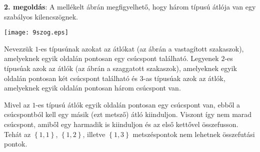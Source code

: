 \documentclass[a4paper,10pt]{article}
\begin{document}
{\bf 2. megoldás}: A mellékelt ábrán megfigyelhető, hogy három
típusú átlója van egy szabályos
kilencszögnek.

\begin{center}
\texttt{[image: 9szog.eps]}%
\end{center}
Nevezzük $1$-es típusúnak azokat az átlókat (az
ábrán a vastagított szakaszok), amelyeknek egyik
oldalán pontosan egy csúcs\-pont található. Legyenek
$2$-es típusúak azok az átlók (az ábrán a
szaggatott szakaszok), amelyeknek egyik oldalán pontosan két
csúcspont található és $3$-as típusúak azok
az átlók, amelyeknek egyik oldalán pontosan három
csúcspont van.

Mivel az $1$-es típusú átlók egyik oldalán
pontosan egy csúcs\-pont van, ebből a csúcspontból
kell egy másik (ezt metsző) átló kiinduljon. Viszont
így nem marad csúcspont, amiből egy harmadik is
kiinduljon és az első kettővel összefusson.
Tehát az $\left\{  1,1\right\}  $, $\left\{  1,2\right\} $,
illetve $\left\{  1,3\right\}  $ metszéspontok nem lehetnek
összefutási pontok.
\end{document}
